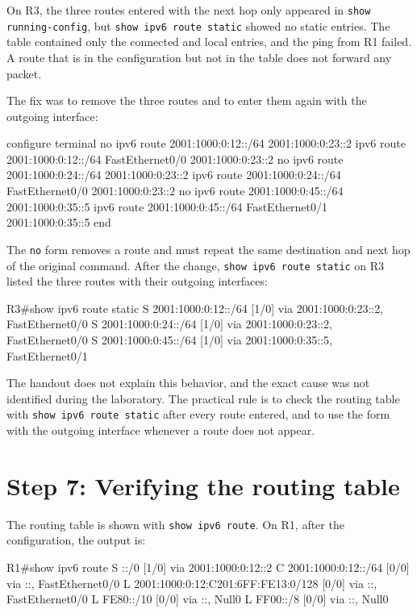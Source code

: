 On R3, the three routes entered with the next hop only appeared in \texttt{show running-config}, but \texttt{show ipv6 route static} showed no static entries. The table contained only the connected and local entries, and the ping from R1 failed. A route that is in the configuration but not in the table does not forward any packet.

The fix was to remove the three routes and to enter them again with the outgoing interface:

\begin{codeblock}
configure terminal
no ipv6 route 2001:1000:0:12::/64 2001:1000:0:23::2
ipv6 route 2001:1000:0:12::/64 FastEthernet0/0 2001:1000:0:23::2
no ipv6 route 2001:1000:0:24::/64 2001:1000:0:23::2
ipv6 route 2001:1000:0:24::/64 FastEthernet0/0 2001:1000:0:23::2
no ipv6 route 2001:1000:0:45::/64 2001:1000:0:35::5
ipv6 route 2001:1000:0:45::/64 FastEthernet0/1 2001:1000:0:35::5
end
\end{codeblock}

The \texttt{no} form removes a route and must repeat the same destination and next hop of the original command. After the change, \texttt{show ipv6 route static} on R3 listed the three routes with their outgoing interfaces:

\begin{codeblock}
R3#show ipv6 route static
S   2001:1000:0:12::/64 [1/0]
     via 2001:1000:0:23::2, FastEthernet0/0
S   2001:1000:0:24::/64 [1/0]
     via 2001:1000:0:23::2, FastEthernet0/0
S   2001:1000:0:45::/64 [1/0]
     via 2001:1000:0:35::5, FastEthernet0/1
\end{codeblock}

The handout does not explain this behavior, and the exact cause was not identified during the laboratory. The practical rule is to check the routing table with \texttt{show ipv6 route static} after every route entered, and to use the form with the outgoing interface whenever a route does not appear.

\section{Step 7: Verifying the routing table}

The routing table is shown with \texttt{show ipv6 route}. On R1, after the configuration, the output is:

\begin{codeblock}
R1#show ipv6 route
S   ::/0 [1/0]
     via 2001:1000:0:12::2
C   2001:1000:0:12::/64 [0/0]
     via ::, FastEthernet0/0
L   2001:1000:0:12:C201:6FF:FE13:0/128 [0/0]
     via ::, FastEthernet0/0
L   FE80::/10 [0/0]
     via ::, Null0
L   FF00::/8 [0/0]
     via ::, Null0
\end{codeblock}

